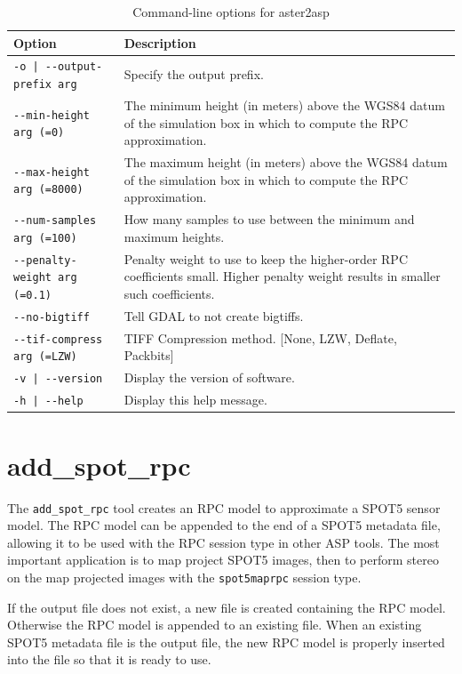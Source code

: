 \begin{longtable}{|l|p{7.5cm}|}
\caption{Command-line options for aster2asp}
\label{tbl:aster2asp}
\endfirsthead
\endhead
\endfoot
\endlastfoot
\hline
Option & Description \\ \hline \hline
\texttt{-o | -\/-output-prefix  arg} & Specify the output prefix.\\ \hline
\texttt{-\/-min-height arg (=0)} & The minimum height (in meters) above the WGS84 datum of the simulation box in which to compute the RPC approximation.\\ \hline
\texttt{-\/-max-height arg (=8000)} & The maximum height (in meters) above the WGS84 datum of the simulation box in which to compute the RPC approximation.\\ \hline
\texttt{-\/-num-samples arg (=100)} & How many samples to use between the minimum and maximum heights.\\ \hline
\texttt{-\/-penalty-weight arg (=0.1)} & Penalty weight to use to keep the higher-order RPC coefficients small. Higher penalty weight results in smaller such coefficients.\\ \hline
\texttt{-\/-no-bigtiff} & Tell GDAL to not create bigtiffs.\\ \hline
\texttt{-\/-tif-compress arg (=LZW)} & TIFF Compression method. [None, LZW, Deflate, Packbits]\\ \hline
\texttt{-v | -\/-version } & Display the version of software.\\ \hline
\texttt{-h | -\/-help } & Display this help message.\\ \hline
\end{longtable}


\section{add\_spot\_rpc}
\label{app:addspotrpc}

The \texttt{add\_spot\_rpc} tool creates an RPC model to approximate a
SPOT5 sensor model.  The RPC model can be appended to the end of a
SPOT5 metadata file, allowing it to be used with the RPC session type
in other ASP tools.  The most important application is to map project
SPOT5 images, then to perform stereo on the map projected images with
the \texttt{spot5maprpc} session type.

If the output file does not exist, a new file is created containing the
RPC model.  Otherwise the RPC model is appended to an existing file.
When an existing SPOT5 metadata file is the output file, the new RPC
model is properly inserted into the file so that it is ready to use.


